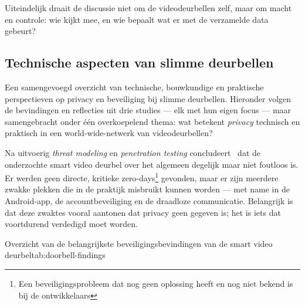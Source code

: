 \documentclass[nonacm, sigconf]{acmart}
\begin{document}
    Uiteindelijk draait de discussie niet om de videodeurbellen zelf, maar om macht en controle: wie kijkt mee, en wie bepaalt wat er met de verzamelde data gebeurt?

    \subsection{Technische aspecten van slimme deurbellen}\label{subsec:technische-aspecten-van-slimme-deurbellen}
    Een samengevoegd overzicht van technische, bouwkundige en praktische perspectieven op privacy en beveiliging bij slimme deurbellen.
    Hieronder volgen de bevindingen en reflecties uit drie studies — elk met hun eigen focus — maar samengebracht onder één overkoepelend thema: wat betekent \emph{privacy} technisch en praktisch in een world-wide-netwerk van videodeurbellen?


    Na uitvoerig \textit{threat modeling} en \textit{penetration testing} concludeert~\parencite{liu2021ethical} dat de onderzochte smart video deurbel over het algemeen degelijk maar niet foutloos is.
    Er werden geen directe, kritieke zero-days\footnote{Een beveiligingsprobleem dat nog geen oplossing heeft en nog niet bekend is bij de ontwikkelaars} gevonden, maar er zijn meerdere zwakke plekken die in de praktijk misbruikt kunnen worden — met name in de Android-app, de accountbeveiliging en de draadloze communicatie.
    Belangrijk is dat deze zwaktes vooral aantonen dat privacy geen gegeven is; het is iets dat voortdurend verdedigd moet worden.

    \begin{SimpleTable}[s{0.5}s{1.5}]{Overzicht van de belangrijkste beveiligingsbevindingen van de smart video deurbel}{tab:doorbell-findings}
    \end{SimpleTable}
\end{document}

